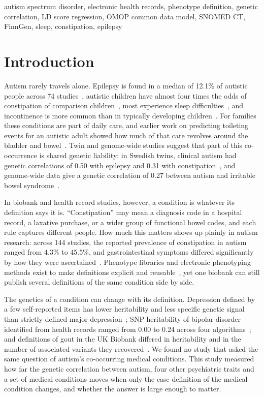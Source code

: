 \documentclass[conference]{IEEEtran}
\begin{document}
\begin{IEEEkeywords}
autism spectrum disorder, electronic health records, phenotype definition, genetic correlation, LD score regression, OMOP common data model, SNOMED CT, FinnGen, sleep, constipation, epilepsy
\end{IEEEkeywords}

\section{Introduction}
Autism rarely travels alone. Epilepsy is found in a median of 12.1\% of autistic people across 74 studies~\cite{lukmanji2019}, autistic children have almost four times the odds of constipation of comparison children~\cite{mcelhanon2014}, most experience sleep difficulties~\cite{richdale2009}, and incontinence is more common than in typically developing children~\cite{niemczyk2017}. For families these conditions are part of daily care, and earlier work on predicting toileting events for an autistic adult showed how much of that care revolves around the bladder and bowel~\cite{obidele2026toileting}. Twin and genome-wide studies suggest that part of this co-occurrence is shared genetic liability: in Swedish twins, clinical autism had genetic correlations of 0.50 with epilepsy and 0.31 with constipation~\cite{pan2023}, and genome-wide data give a genetic correlation of 0.27 between autism and irritable bowel syndrome~\cite{li2024}.

In biobank and health record studies, however, a condition is whatever its definition says it is. ``Constipation'' may mean a diagnosis code in a hospital record, a laxative purchase, or a wider group of functional bowel codes, and each rule captures different people. How much this matters shows up plainly in autism research: across 144 studies, the reported prevalence of constipation in autism ranged from 4.3\% to 45.5\%, and gastrointestinal symptoms differed significantly by how they were ascertained~\cite{holingue2018}. Phenotype libraries and electronic phenotyping methods exist to make definitions explicit and reusable~\cite{kirby2016,denaxas2019,banda2018}, yet one biobank can still publish several definitions of the same condition side by side.

The genetics of a condition can change with its definition. Depression defined by a few self-reported items has lower heritability and less specific genetic signal than strictly defined major depression~\cite{cai2020}; SNP heritability of bipolar disorder identified from health records ranged from 0.00 to 0.24 across four algorithms~\cite{chen2018}; and definitions of gout in the UK Biobank differed in heritability and in the number of associated variants they recovered~\cite{cadzow2017}. We found no study that asked the same question of autism's co-occurring medical conditions. This study measured how far the genetic correlation between autism, four other psychiatric traits and a set of medical conditions moves when only the case definition of the medical condition changes, and whether the answer is large enough to matter.
\end{document}

